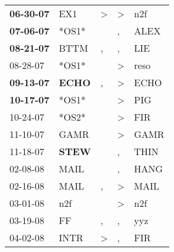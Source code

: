 \begin{supertabular}{p{0.07\textwidth}p{0.06\textwidth}p{0.02\textwidth}p{0.02\textwidth}p{0.06\textwidth}}
 \textbf{06-30-07\textsuperscript{}} &            EX1\textsuperscript{} &     \textgreater &     \textgreater &            n2f\textsuperscript{} \\
 \textbf{07-06-07\textsuperscript{}} &                            *OS1* &                  &                , &           ALEX\textsuperscript{} \\
 \textbf{08-21-07\textsuperscript{}} &           BTTM\textsuperscript{} &                , &                , &            LIE\textsuperscript{} \\
          08-28-07\textsuperscript{} &                            *OS1* &                  &     \textgreater &           reso\textsuperscript{} \\
 \textbf{09-13-07\textsuperscript{}} &  \textbf{ECHO\textsuperscript{}} &                , &     \textgreater &           ECHO\textsuperscript{} \\
 \textbf{10-17-07\textsuperscript{}} &                            *OS1* &                  &     \textgreater &            PIG\textsuperscript{} \\
          10-24-07\textsuperscript{} &                            *OS2* &                  &     \textgreater &            FIR\textsuperscript{} \\
          11-10-07\textsuperscript{} &           GAMR\textsuperscript{} &                  &     \textgreater &           GAMR\textsuperscript{} \\
          11-18-07\textsuperscript{} &  \textbf{STEW\textsuperscript{}} &                  &                , &           THIN\textsuperscript{} \\
          02-08-08\textsuperscript{} &           MAIL\textsuperscript{} &                  &                , &           HANG\textsuperscript{} \\
          02-16-08\textsuperscript{} &           MAIL\textsuperscript{} &                , &     \textgreater &           MAIL\textsuperscript{} \\
          03-01-08\textsuperscript{} &            n2f\textsuperscript{} &                  &     \textgreater &            n2f\textsuperscript{} \\
          03-19-08\textsuperscript{} &             FF\textsuperscript{} &                , &                , &            yyz\textsuperscript{} \\
          04-02-08\textsuperscript{} &           INTR\textsuperscript{} &     \textgreater &                , &            FIR\textsuperscript{} \\

\end{supertabular}
